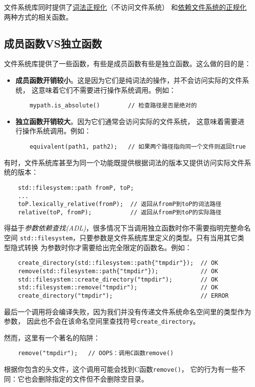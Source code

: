 文件系统库同时提供了\hyperref[ch20.3.3]{词法正规化}（不访问文件系统）
和\hyperref[ch20.4.5]{依赖文件系统的正规化}两种方式的相关函数。

\subsection{成员函数VS独立函数}
文件系统库提供了一些函数，有些是成员函数有些是独立函数。这么做的目的是：
\begin{itemize}
    \item \textbf{成员函数开销较小}。这是因为它们是纯词法的操作，并不会访问实际的文件系统，
    这意味着它们不需要进行操作系统调用。例如：
    \begin{lstlisting}
    mypath.is_absolute()        // 检查路径是否是绝对的
    \end{lstlisting}
    \item \textbf{独立函数开销较大}。因为它们通常会访问实际的文件系统，
    这意味着需要进行操作系统调用。例如：
    \begin{lstlisting}
    equivalent(path1, path2);   // 如果两个路径指向同一个文件则返回true
    \end{lstlisting}
\end{itemize}
有时，文件系统库甚至为同一个功能既提供根据词法的版本又提供访问实际文件系统的版本：
\begin{lstlisting}
    std::filesystem::path fromP, toP;
    ...
    toP.lexically_relative(fromP);  // 返回从fromP到toP的词法路径
    relative(toP, fromP);           // 返回从fromP到toP的实际路径
\end{lstlisting}
得益于\emph{参数依赖查找(ADL)}，很多情况下当调用独立函数时你不需要指明完整命名空间
\texttt{std::filesystem}，只要参数是文件系统库里定义的类型。只有当用其它类型隐式转换
为参数时你才需要给出完全限定的函数名。例如：\label{ADL导致意外行为}
\begin{lstlisting}
    create_directory(std::filesystem::path{"tmpdir"});  // OK
    remove(std::filesystem::path{"tmpdir"});            // OK
    std::filesystem::create_directory("tmpdir");        // OK
    std::filesystem::remove("tmpdir");                  // OK
    create_directory("tmpdir");                         // ERROR
\end{lstlisting}
最后一个调用将会编译失败，因为我们并没有传递文件系统命名空间里的类型作为参数，
因此也不会在该命名空间里查找符号\texttt{create\_directory}。

然而，这里有一个著名的陷阱：
\begin{lstlisting}
    remove("tmpdir");   // OOPS：调用C函数remove()
\end{lstlisting}
根据你包含的头文件，这个调用可能会找到C函数\texttt{remove()}，
它的行为有一些不同：它也会删除指定的文件但不会删除空目录。

